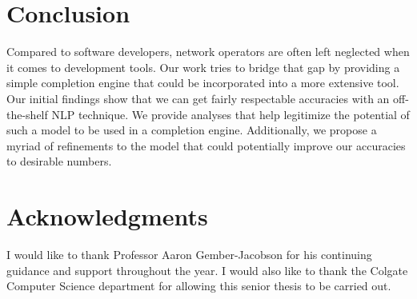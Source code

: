 \section{Conclusion}
Compared to software developers, network operators are often left neglected when it comes to development tools. Our work tries to bridge that gap by providing a simple completion engine that could be incorporated into a more extensive tool. Our initial findings show that we can get fairly respectable accuracies with an off-the-shelf NLP technique. We provide analyses that help legitimize the potential of such a model to be used in a completion engine. Additionally, we propose a myriad of refinements to the model that could potentially improve our accuracies to desirable numbers.

\section{Acknowledgments}
I would like to thank Professor Aaron Gember-Jacobson for his continuing guidance and support throughout the year. I would also like to thank the Colgate Computer Science department for allowing this senior thesis to be carried out.